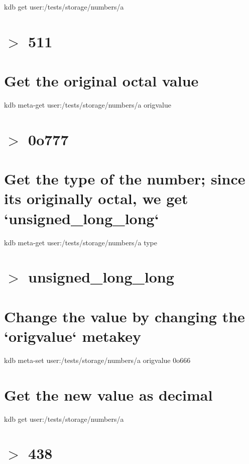 kdb get \textquotesingle{}user\+:/tests/storage/numbers/a\textquotesingle{} \hypertarget{autotoc_md635_autotoc_md671}{}\section{$>$ 511}\label{autotoc_md635_autotoc_md671}
\hypertarget{autotoc_md635_autotoc_md672}{}\section{Get the original octal value}\label{autotoc_md635_autotoc_md672}
kdb meta-\/get \textquotesingle{}user\+:/tests/storage/numbers/a\textquotesingle{} \textquotesingle{}origvalue\textquotesingle{} \hypertarget{autotoc_md635_autotoc_md673}{}\section{$>$ 0o777}\label{autotoc_md635_autotoc_md673}
\hypertarget{autotoc_md635_autotoc_md674}{}\section{Get the type of the number; since it\textquotesingle{}s originally octal, we get `unsigned\+\_\+long\+\_\+long`}\label{autotoc_md635_autotoc_md674}
kdb meta-\/get \textquotesingle{}user\+:/tests/storage/numbers/a\textquotesingle{} \textquotesingle{}type\textquotesingle{} \hypertarget{autotoc_md635_autotoc_md675}{}\section{$>$ unsigned\+\_\+long\+\_\+long}\label{autotoc_md635_autotoc_md675}
\hypertarget{autotoc_md635_autotoc_md676}{}\section{Change the value by changing the `origvalue` metakey}\label{autotoc_md635_autotoc_md676}
kdb meta-\/set \textquotesingle{}user\+:/tests/storage/numbers/a\textquotesingle{} \textquotesingle{}origvalue\textquotesingle{} \textquotesingle{}0o666\textquotesingle{}\hypertarget{autotoc_md635_autotoc_md677}{}\section{Get the new value as decimal}\label{autotoc_md635_autotoc_md677}
kdb get \textquotesingle{}user\+:/tests/storage/numbers/a\textquotesingle{} \hypertarget{autotoc_md635_autotoc_md678}{}\section{$>$ 438}\label{autotoc_md635_autotoc_md678}
